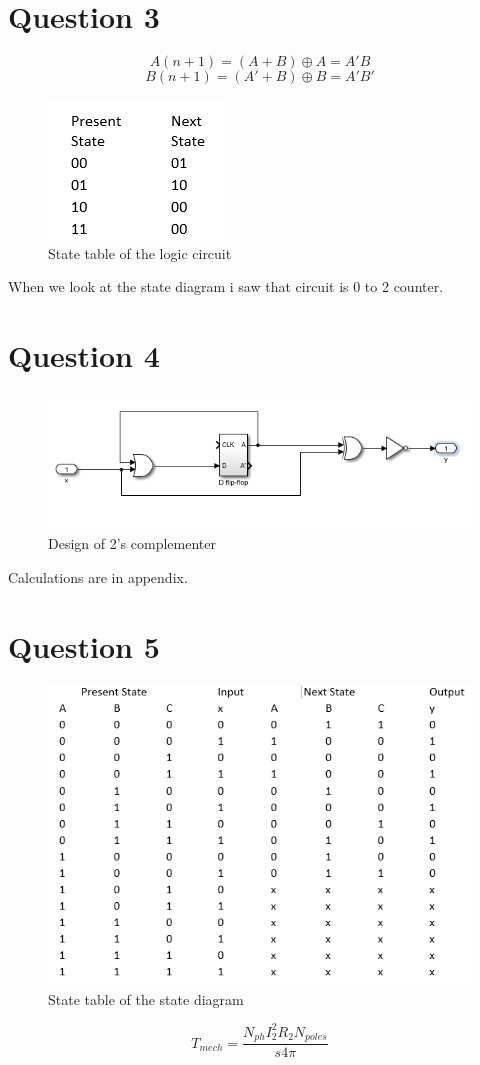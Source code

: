 \documentclass[11 pt]{article}
\begin{document}
\section*{Question 3}
\[A(n+1)=(A+B)\mathbin{\oplus} A = A'B\]
\[B(n+1)=(A'+B)\mathbin{\oplus} B = A'B'\]
\begin{figure}[H]
\centering
  \includegraphics[scale=0.7]{q3}
  \caption{State table of the logic circuit}
  \label{fig:zero}
\end{figure}
When  we look at the state diagram i saw that circuit is 0 to 2 counter. 
\section*{Question 4}
\begin{figure}[H]
\centering
  \includegraphics[scale=0.7]{q4}
  \caption{Design of 2's complementer}
  \label{fig:zero}
\end{figure}
Calculations are in appendix.
\section*{Question 5}
\begin{figure}[H]
\centering
  \includegraphics[scale=0.7]{q5}
  \caption{State table of the state diagram}
  \label{fig:zero}
\end{figure}
$$T_{mech}=\frac{N_{ph}I_2^2R_2N_{poles}}{s 4 \pi }$$
\end{document}
